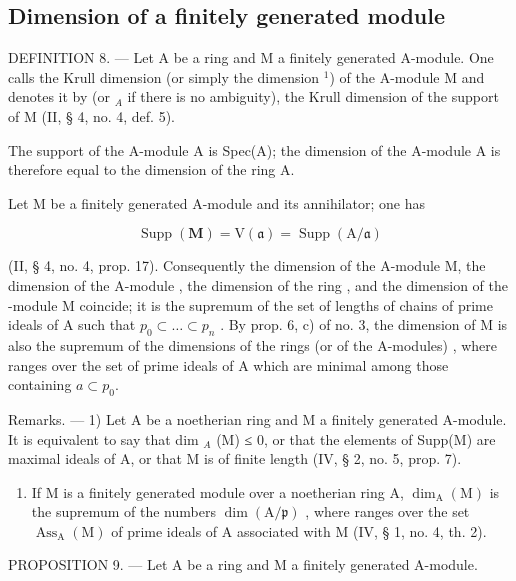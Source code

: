 \subsection{Dimension of a finitely generated module}

DEFINITION 8. — Let A be a ring and M a finitely generated A-module. One calls the Krull dimension (or simply the dimension \(^{1}\)) of the A-module M and denotes it by  (or \(_{A}\) if there is no ambiguity), the Krull dimension of the support of M (II, § 4, no. 4, def. 5).

The support of the A-module A is Spec(A); the dimension of the A-module A is therefore equal to the dimension of the ring A.

Let M be a finitely generated A-module and  its annihilator; one has

\[
\operatorname{Supp} (\mathbf {M}) = \mathrm{V} (\mathfrak {a}) = \operatorname{Supp} (\mathrm{A} / \mathfrak {a})
\]

(II, § 4, no. 4, prop. 17). Consequently the dimension of the A-module M, the dimension of the A-module , the dimension of the ring , and the dimension of the -module M coincide; it is the supremum of the set of lengths of chains  of prime ideals of A such that \(p_0 \subset \ldots \subset p_n\) . By prop. 6, c) of no. 3, the dimension of M is also the supremum of the dimensions of the rings (or of the A-modules) , where  ranges over the set of prime ideals of A which are minimal among those containing \(a \subset p_0\).

Remarks. — 1) Let A be a noetherian ring and M a finitely generated A-module. It is equivalent to say that dim \(_{A}\) (M) ≤ 0, or that the elements of Supp(M) are maximal ideals of A, or that M is of finite length (IV, § 2, no. 5, prop. 7).

\begin{enumerate}
\def\labelenumi{\arabic{enumi})}
\setcounter{enumi}{1}
\tightlist
\item
  If M is a finitely generated module over a noetherian ring A, \(\dim_{\mathrm{A}}(\mathrm{M})\) is the supremum of the numbers \(\dim(\mathrm{A}/\mathfrak{p})\) , where  ranges over the set \(\operatorname{Ass}_{\mathrm{A}}(\mathrm{M})\) of prime ideals of A associated with M (IV, § 1, no. 4, th. 2).
\end{enumerate}

PROPOSITION 9. — Let A be a ring and M a finitely generated A-module.

